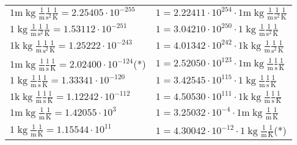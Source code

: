 \begin{center}
\begin{longtable}{l l}
{\color{gray}$1 \bm{\mathrm{ m}}\operatorname{kg}\frac1{\operatorname{m}}\frac1{\operatorname{s}^2}{}\frac1{\operatorname{K}} = 2.25405\cdot10^{-255} $}   & {\color{gray}$ 1 = 2.22411\cdot10^{254} \cdot 1 \bm{\mathrm{ m}}\operatorname{kg}\frac1{\operatorname{m}}\frac1{\operatorname{s}^2}{}\frac1{\operatorname{K}}$}  \\
{\color{black}$1 \bm{\mathrm{ }}\operatorname{kg}\frac1{\operatorname{m}}\frac1{\operatorname{s}^2}{}\frac1{\operatorname{K}} = 1.53112\cdot10^{-251} $}   & {\color{black}$ 1 = 3.04210\cdot10^{250} \cdot 1 \bm{\mathrm{ }}\operatorname{kg}\frac1{\operatorname{m}}\frac1{\operatorname{s}^2}{}\frac1{\operatorname{K}}$}  \\
{\color{gray}$1 \bm{\mathrm{ k}}\operatorname{kg}\frac1{\operatorname{m}}\frac1{\operatorname{s}^2}{}\frac1{\operatorname{K}} = 1.25222\cdot10^{-243} $}   & {\color{gray}$ 1 = 4.01342\cdot10^{242} \cdot 1 \bm{\mathrm{ k}}\operatorname{kg}\frac1{\operatorname{m}}\frac1{\operatorname{s}^2}{}\frac1{\operatorname{K}}$}  \\
{\color{gray}$1 \bm{\mathrm{ m}}\operatorname{kg}\frac1{\operatorname{m}}\frac1{\operatorname{s}}{}\frac1{\operatorname{K}} = 2.02400\cdot10^{-124} $}\quad(*) & {\color{gray}$ 1 = 2.52050\cdot10^{123} \cdot 1 \bm{\mathrm{ m}}\operatorname{kg}\frac1{\operatorname{m}}\frac1{\operatorname{s}}{}\frac1{\operatorname{K}}$}  \\
{\color{black}$1 \bm{\mathrm{ }}\operatorname{kg}\frac1{\operatorname{m}}\frac1{\operatorname{s}}{}\frac1{\operatorname{K}} = 1.33341\cdot10^{-120} $}   & {\color{black}$ 1 = 3.42545\cdot10^{115} \cdot 1 \bm{\mathrm{ }}\operatorname{kg}\frac1{\operatorname{m}}\frac1{\operatorname{s}}{}\frac1{\operatorname{K}}$}  \\
{\color{gray}$1 \bm{\mathrm{ k}}\operatorname{kg}\frac1{\operatorname{m}}\frac1{\operatorname{s}}{}\frac1{\operatorname{K}} = 1.12242\cdot10^{-112} $}   & {\color{gray}$ 1 = 4.50530\cdot10^{111} \cdot 1 \bm{\mathrm{ k}}\operatorname{kg}\frac1{\operatorname{m}}\frac1{\operatorname{s}}{}\frac1{\operatorname{K}}$}  \\
{\color{gray}$1 \bm{\mathrm{ m}}\operatorname{kg}\frac1{\operatorname{m}}{}{}\frac1{\operatorname{K}} = 1.42055\cdot10^{3} $}   & {\color{gray}$ 1 = 3.25032\cdot10^{-4} \cdot 1 \bm{\mathrm{ m}}\operatorname{kg}\frac1{\operatorname{m}}{}{}\frac1{\operatorname{K}}$}  \\
{\color{black}$1 \bm{\mathrm{ }}\operatorname{kg}\frac1{\operatorname{m}}{}{}\frac1{\operatorname{K}} = 1.15544\cdot10^{11} $}   & {\color{black}$ 1 = 4.30042\cdot10^{-12} \cdot 1 \bm{\mathrm{ }}\operatorname{kg}\frac1{\operatorname{m}}{}{}\frac1{\operatorname{K}}$}\quad(*)\\

\end{longtable}
\end{center}
